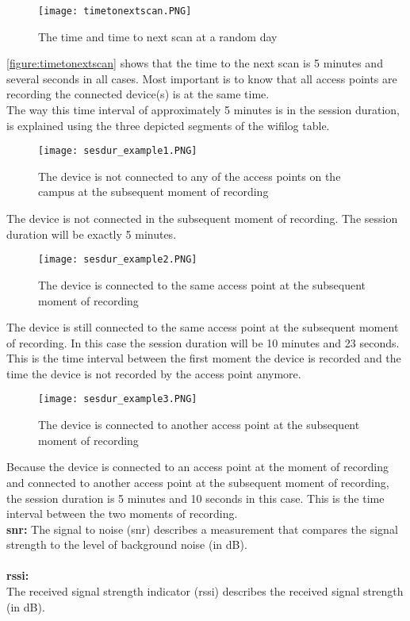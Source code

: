 \begin{figure}[H]
	\centering
	\texttt{[image: timetonextscan.PNG]}
	\captionsetup{justification=centering}
	\caption{The time and time to next scan at a random day}
	\label{figure:timetonextscan}
\end{figure}

\autoref{figure:timetonextscan} shows that the time to the next scan is 5 minutes and several seconds in all cases. Most important is to know that all access points are recording the connected device(s) is at the same time. 
\\
The way this time interval of approximately 5 minutes is in the session duration, is explained using the three depicted segments of the wifilog table.

\begin{figure}[H]
	\centering
	\texttt{[image: sesdur\_example1.PNG]}
	\captionsetup{justification=centering}
	\caption{The device is not connected to any of the access points on the campus at the subsequent moment of recording}
	\label{sesdur_example1}
\end{figure}
The device is not connected in the subsequent moment of recording. The session duration will be exactly 5 minutes.
\\
\begin{figure}[H]
	\centering
	\texttt{[image: sesdur\_example2.PNG]}
	\captionsetup{justification=centering}
	\caption{The device is connected to the same access point at the subsequent moment of recording}
	\label{sesdur_example2}
\end{figure}
The device is still connected to the same access point at the subsequent moment of recording. In this case the session duration will be 10 minutes and 23 seconds. This is the time interval between the first moment the device is recorded and the time the device is not recorded by the access point anymore.
\\
\begin{figure}[H]
	\centering
	\texttt{[image: sesdur\_example3.PNG]}
	\captionsetup{justification=centering}
	\caption{The device is connected to another access point at the subsequent moment of recording}
	\label{sesdur_exampl3e}
\end{figure}
Because the device is connected to an access point at the moment of recording and connected to another access point at the subsequent moment of recording, the session duration is 5 minutes and 10 seconds in this case. This is the time interval between the two moments of recording.
\\
\textbf{snr:}
The signal to noise (snr) describes a measurement that compares the signal strength to the level of background noise (in dB).\\\\
\textbf{rssi:} \\
The received signal strength indicator (rssi) describes the received signal strength (in dB).

